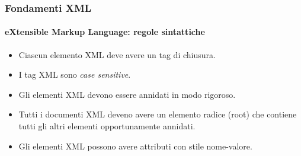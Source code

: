 \begin{frame}
	\frametitle{Fondamenti XML}
	\framesubtitle{eXtensible Markup Language: regole sintattiche}
	\addtocounter{nframe}{1}

	\begin{itemize}

		\item Ciascun elemento XML deve avere un tag di chiusura.

		\item I tag XML sono \textit{case sensitive}.

		\item Gli elementi XML devono essere annidati in modo rigoroso.

		\item Tutti i documenti XML deveno avere un elemento radice (root) che contiene tutti gli altri elementi opportunamente annidati.

		\item Gli elementi XML possono avere attributi con stile nome-valore.
		
	\end{itemize}

\end{frame}


